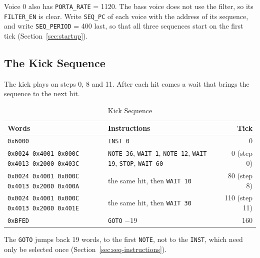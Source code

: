 \noindent Voice 0 also has \texttt{PORTA\_RATE} = 1120. The bass voice does not use the filter, so its \texttt{FILTER\_EN} is clear. Write \texttt{SEQ\_PC} of each voice with the address of its sequence, and write
\texttt{SEQ\_PERIOD} = 400 last, so that all three sequences start on the first tick (Section~\ref{sec:startup}).

\subsection{The Kick Sequence}

The kick plays on steps 0, 8 and 11. After each hit comes a wait that brings the sequence to the next hit.

\begin{table}[H]
	\centering
	\small
	\begin{tabular}{p{6.7cm}p{4.3cm}r}
		\toprule
		\textbf{Words}                                     & \textbf{Instructions}                                                                                  & \textbf{Tick} \\
		\midrule
		\texttt{0x6000}                                    & \texttt{INST 0}                                                                                        & 0             \\
		\texttt{0x0024 0x4001 0x000C 0x4013 0x2000 0x403C} & \texttt{NOTE 36}, \texttt{WAIT 1}, \texttt{NOTE 12}, \texttt{WAIT 19}, \texttt{STOP}, \texttt{WAIT 60} & 0 (step 0)    \\
		\texttt{0x0024 0x4001 0x000C 0x4013 0x2000 0x400A} & the same hit, then \texttt{WAIT 10}                                                                    & 80 (step 8)   \\
		\texttt{0x0024 0x4001 0x000C 0x4013 0x2000 0x401E} & the same hit, then \texttt{WAIT 30}                                                                    & 110 (step 11) \\
		\texttt{0xBFED}                                    & \texttt{GOTO} $-19$                                                                                    & 160           \\
		\bottomrule
	\end{tabular}
	\caption{Kick Sequence}
	\label{tab:ex-kick-pattern}
\end{table}

\noindent The \texttt{GOTO} jumps back 19 words, to the first \texttt{NOTE}, not to the \texttt{INST}, which need
only be selected once (Section~\ref{sec:seq-instructions}).

